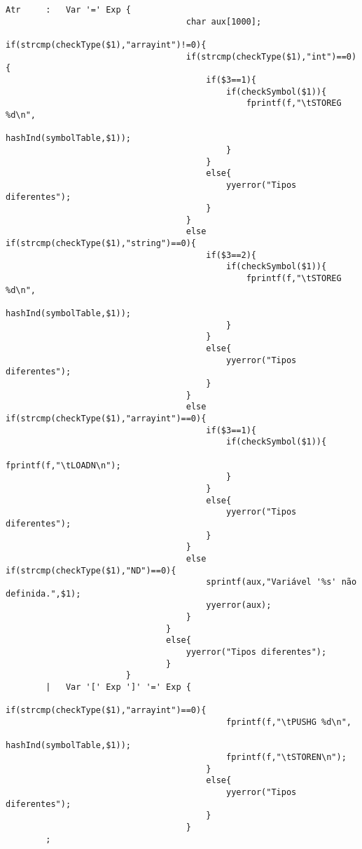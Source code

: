 \documentclass{report}
\begin{document}
\begin{verbatim}
Atr     :   Var '=' Exp {
                                    char aux[1000];
                                if(strcmp(checkType($1),"arrayint")!=0){
                                    if(strcmp(checkType($1),"int")==0){
                                        if($3==1){
                                            if(checkSymbol($1)){
                                                fprintf(f,"\tSTOREG %d\n", 
                                                    hashInd(symbolTable,$1));
                                            }
                                        }
                                        else{
                                            yyerror("Tipos diferentes");
                                        }
                                    }
                                    else if(strcmp(checkType($1),"string")==0){
                                        if($3==2){
                                            if(checkSymbol($1)){
                                                fprintf(f,"\tSTOREG %d\n", 
                                                    hashInd(symbolTable,$1));
                                            }
                                        }
                                        else{
                                            yyerror("Tipos diferentes");
                                        }
                                    }
                                    else if(strcmp(checkType($1),"arrayint")==0){
                                        if($3==1){
                                            if(checkSymbol($1)){
                                                fprintf(f,"\tLOADN\n");
                                            }
                                        }
                                        else{
                                            yyerror("Tipos diferentes");
                                        }
                                    }
                                    else if(strcmp(checkType($1),"ND")==0){
                                        sprintf(aux,"Variável '%s' não definida.",$1);
                                        yyerror(aux);
                                    }
                                }
                                else{
                                    yyerror("Tipos diferentes");
                                }
                        }
        |   Var '[' Exp ']' '=' Exp {
                                        if(strcmp(checkType($1),"arrayint")==0){
                                            fprintf(f,"\tPUSHG %d\n", 
                                                hashInd(symbolTable,$1));
                                            fprintf(f,"\tSTOREN\n");
                                        }
                                        else{
                                            yyerror("Tipos diferentes");
                                        }
                                    }
        ;


\end{verbatim}
\end{document}
